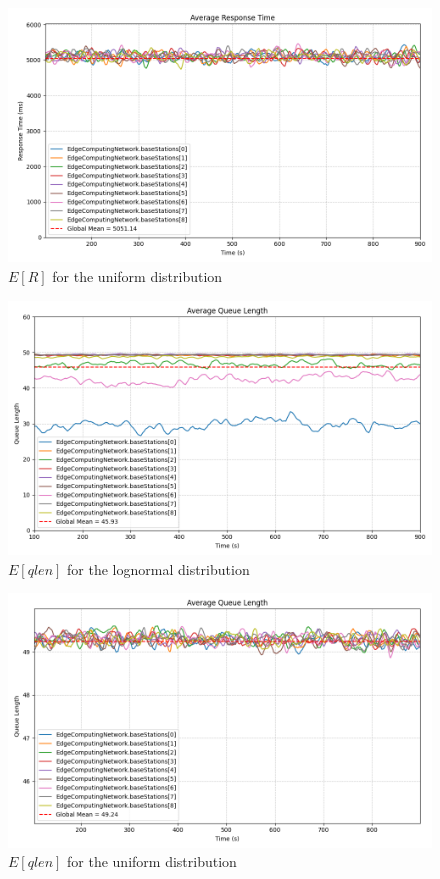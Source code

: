 \documentclass{report}
\begin{document}
\begin{figure}[H]
    \centering
    \includegraphics[width=\textwidth]{img/plots/uni_1e4_A/resptime.png}
    \caption{$E[R]$ for the uniform distribution}
\end{figure}

\begin{figure}[H]
    \centering
    \includegraphics[width=\textwidth]{img/plots/log_1e4_A/qlen.png}
    \caption{$E[qlen]$ for the lognormal distribution}
\end{figure}

\begin{figure}[H]
    \centering
    \includegraphics[width=\textwidth]{img/plots/uni_1e4_A/qlen.png}
    \caption{$E[qlen]$ for the uniform distribution}
\end{figure}
\end{document}
